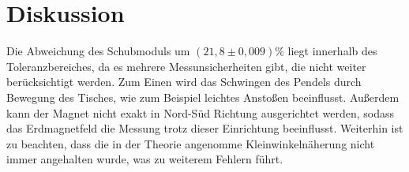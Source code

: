 \section{Diskussion}
\label{sec:Diskussion}

Die Abweichung des Schubmoduls um $(21,8 \pm 0,009)\%$ liegt innerhalb des Toleranzbereiches, da es mehrere Messunsicherheiten gibt, die nicht weiter berücksichtigt werden. Zum Einen wird das Schwingen des Pendels durch Bewegung des Tisches, wie zum Beispiel leichtes Anstoßen beeinflusst. Außerdem kann der Magnet nicht exakt in Nord-Süd Richtung ausgerichtet werden, sodass das Erdmagnetfeld die Messung trotz dieser Einrichtung beeinflusst. Weiterhin ist zu beachten, dass die in der Theorie angenomme Kleinwinkelnäherung nicht immer angehalten wurde, was zu weiterem Fehlern führt.
